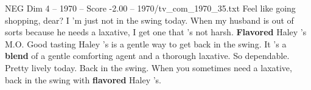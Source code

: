 \begin{textsample}{NEG Dim 4 – 1970 – Score -2.00 – 1970/tv\_com\_1970\_35.txt}  \label{ex:f4_neg_054}
Feel like going shopping, dear?
I 'm just not in the swing today.
When my husband is out of sorts because he needs a laxative, I get one that 's not harsh. \textbf{Flavored} Haley 's M.O.
Good tasting Haley 's is a gentle way to get back in the swing.
It 's a \textbf{blend} of a gentle comforting agent and a thorough laxative.
So dependable.
Pretty lively today.
Back in the swing.
When you sometimes need a laxative, back in the swing with \textbf{flavored} Haley 's.

\end{textsample}
